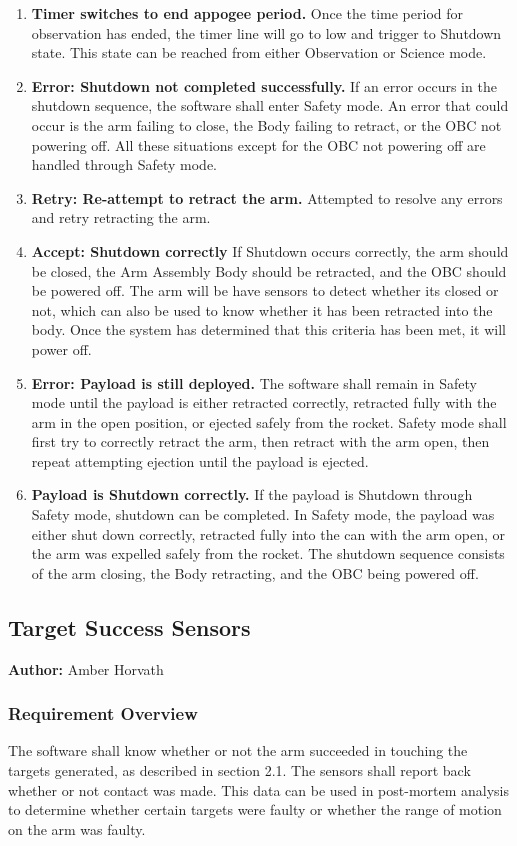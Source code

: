 \documentclass[letterpaper,10pt]{article}
\begin{document}
\begin{center}
\begin{enumerate}
{notified via an interrupt.}
\item{\textbf{Timer switches to end appogee period.} Once the time period for observation has ended, the timer line will go to low and trigger to Shutdown state. This state can be reached from either Observation or Science mode.}
\item{\textbf{Error: Shutdown not completed successfully.} If an error occurs in the shutdown sequence, the software shall enter Safety mode. An error that could occur is the arm failing to close, the Body failing to retract, or the \gls{OBC} not powering off. All 
these situations except for the \gls{OBC} not powering off are handled through Safety mode.}
\item{\textbf{Retry: Re-attempt to retract the arm.} Attempted to resolve any errors and retry retracting the arm.}
\item{\textbf{Accept: Shutdown correctly} If Shutdown occurs correctly, the arm should be closed, the Arm Assembly Body should be retracted, and the \gls{OBC} should be powered off. The arm will be have sensors to detect whether its closed or not, which can also
be used to know whether it has been retracted into the body. Once the system has determined that this criteria has been met, it
will power off.}
\item{\textbf{Error: Payload is still deployed.} The software shall remain in Safety mode until the payload is either retracted correctly, retracted fully with the arm in the open position, or ejected safely from the rocket. Safety mode shall first try to correctly retract the arm, then retract with the arm open, then repeat attempting ejection until the payload is ejected.}
\item{\textbf{Payload is Shutdown correctly.} If the payload is Shutdown through Safety mode, shutdown can be completed. In Safety mode, the payload was either shut down correctly, retracted fully into the can with the arm open, or the arm was expelled safely from the rocket. The shutdown sequence consists of the arm closing, the Body retracting, and the \gls{OBC} being powered off.}
\end{enumerate}
\end{center}

\subsection{Target Success Sensors}
\textbf{Author:} Amber Horvath
\label{subsec:tests}
\subsubsection{Requirement Overview}
The software shall know whether or not the arm succeeded in touching the targets generated, as described in section 2.1. The sensors
shall report back whether or not contact was made. This data can be used in post-mortem analysis to determine whether
certain targets were faulty or whether the range of motion on the arm was faulty.
\end{document}
